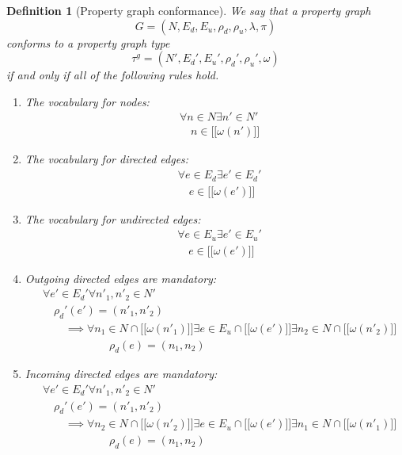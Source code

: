 \documentclass[a4paper]{article}
\newtheorem{definition}[theorem]{Definition}
\newcommand{\gtype}{\tau^g}
\newcommand{\lsem}{\ensuremath{[\![}}
\newcommand{\rsem}{\ensuremath{]\!]}}
\newcommand{\sem}[1]{\ensuremath{\lsem #1 \rsem}}
\begin{document}
\begin{definition}[Property graph conformance]
  We say that a property graph \[G = (N, E_d, E_u, \rho_d, \rho_u, \lambda, \pi)\] \emph{conforms} to a property graph type \[\gtype = (N', E_d', E_u', \rho_d', \rho_u', \omega)\] if and only if all of the following rules hold.

  \begin{enumerate}
    \item The vocabulary for nodes:
    \begin{align*}
      &\forall n \in N \exists n' \in N'\\
      &\quad n \in \sem{\omega(n')}
    \end{align*}
    
    \item The vocabulary for directed edges:
    \begin{align*}
      &\forall e \in E_d \exists e' \in E_d'\\
      &\quad e \in \sem{\omega(e')}
    \end{align*}

    \item The vocabulary for undirected edges:
    \begin{align*}
      &\forall e \in E_u \exists e' \in E_u'\\
      &\quad e \in \sem{\omega(e')}
    \end{align*}
    
    \item Outgoing directed edges are mandatory:
    \begin{align*}
      &\forall e' \in E_d' \forall n'_1, n'_2 \in N'\\
      &\quad\rho_d'(e') = (n'_1, n'_2)\\
      &\quad\quad\implies {} \forall n_1 \in N \cap \sem{\omega(n'_1)} \exists e \in E_u \cap \sem{\omega(e')} \exists n_2 \in N \cap \sem{\omega(n'_2)}\\
      &\quad\quad\quad\quad\quad\quad\rho_d(e) = (n_1, n_2)
    \end{align*}

    \item Incoming directed edges are mandatory:
    \begin{align*}
      &\forall e' \in E_d' \forall n'_1, n'_2 \in N'\\
      &\quad\rho_d'(e') = (n'_1, n'_2)\\
      &\quad\quad\implies {} \forall n_2 \in N \cap \sem{\omega(n'_2)} \exists e \in E_u \cap \sem{\omega(e')} \exists n_1 \in N \cap \sem{\omega(n'_1)}\\
      &\quad\quad\quad\quad\quad\quad\rho_d(e) = (n_1, n_2)
    \end{align*}
    

\end{enumerate}
\end{definition}
\end{document}
